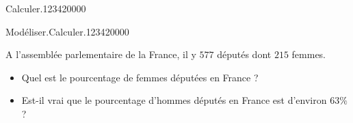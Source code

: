 \begin{pageParcoursu}
\begin{ExoCu}{ Calculer.}{1234}{2}{0}{0}{0}{0}
\end{ExoCu}

\begin{ExoCu}{Modéliser.Calculer.}{1234}{2}{0}{0}{0}{0}
 
 A l'assemblée parlementaire de la France, il y $577$ députés dont $215$ femmes.
 
\begin{itemize}[leftmargin=*]
\item Quel est le pourcentage de femmes députées en France ?
\item Est-il vrai que le pourcentage d'hommes députés en France est d'environ $63\%$ ?
\end{itemize}
\end{ExoCu}


\end{pageParcoursu}
